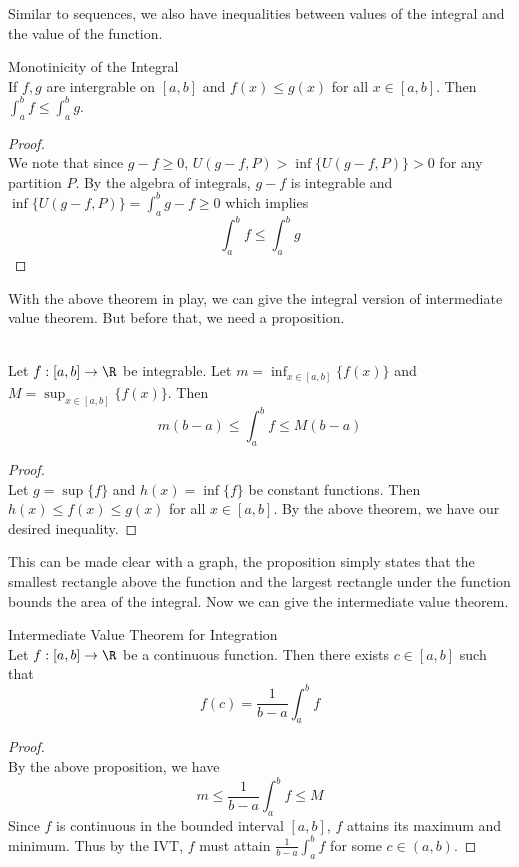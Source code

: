\documentclass[a4paper]{article}
\begin{document}
Similar to sequences, we also have inequalities between values of the integral and the value of the function. 

\begin{thm}{Monotinicity of the Integral}{}\\ If $f,g$ are intergrable on $[a,b]$ and $f(x)\leq g(x)$ for all $x\in[a,b]$. Then $\int_{a}^{b}f\leq\int_{a}^{b}g$. 
\begin{proof}\\ We note that since $g-f\geq 0$, $U(g-f,P)>\inf\{U(g-f,P)\}>0$ for any partition $P$. By the algebra of integrals, $g-f$ is integrable and $\inf\{U(g-f,P)\}=\int_a^bg-f\geq 0$ which implies $$\int_a^bf\leq\int_a^bg$$
\end{proof}
\end{thm}

With the above theorem in play, we can give the integral version of intermediate value theorem. But before that, we need a proposition. 

\begin{prp}{}{}\\ Let $f:[a,b]\to\R$ be integrable. Let $m=\inf_{x\in[a,b]}\{f(x)\}$ and $M=\sup_{x\in[a,b]}\{f(x)\}$. Then $$m(b-a)\leq\int_{a}^{b}f\leq M(b-a)$$ 
\begin{proof}\\ Let $g=\sup\{f\}$ and $h(x)=\inf\{f\}$ be constant functions. Then $h(x)\leq f(x)\leq g(x)$ for all $x\in[a,b]$. By the above theorem, we have our desired inequality. 
\end{proof}
\end{prp}

This can be made clear with a graph, the proposition simply states that the smallest rectangle above the function and the largest rectangle under the function bounds the area of the integral. Now we can give the intermediate value theorem. 

\begin{thm}{Intermediate Value Theorem for Integration}{}\\ Let $f:[a,b]\to\R$ be a continuous function. Then there exists $c\in[a,b]$ such that $$f(c)=\frac{1}{b-a}\int_{a}^{b}f$$ 
\begin{proof}\\ By the above proposition, we have $$m\leq\frac{1}{b-a}\int_a^bf\leq M$$ Since $f$ is continuous in the bounded interval $[a,b]$, $f$ attains its maximum and minimum. Thus by the IVT, $f$ must attain $\frac{1}{b-a}\int_a^bf$ for some $c\in(a,b)$. 
\end{proof}
\end{thm}
\end{document}
